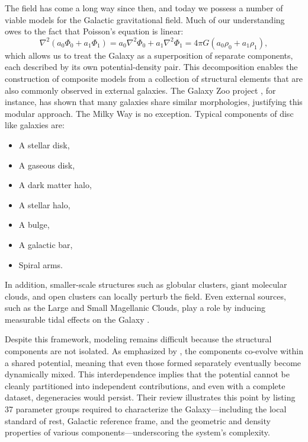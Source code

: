         The field has come a long way since then, and today we possess a number of viable models for the Galactic gravitational field. Much of our understanding owes to the fact that Poisson's equation is linear:
        \begin{equation}\label{eq:linear_poisson}
            \nabla^2 \left(a_0\Phi_0 + a_1\Phi_1 \right) = a_0 \nabla^2 \Phi_0 + a_1 \nabla^2 \Phi_1 = 4\pi G \left(a_0\rho_0 +a_1\rho_1\right),
        \end{equation}
        which allows us to treat the Galaxy as a superposition of separate components, each described by its own potential-density pair. This decomposition enables the construction of composite models from a collection of structural elements that are also commonly observed in external galaxies. The Galaxy Zoo project \citep{2008MNRAS.389.1179L}, for instance, has shown that many galaxies share similar morphologies, justifying this modular approach. The Milky Way is no exception. Typical components of disc like galaxies are:
        \begin{itemize}
            \item A stellar disk,
            \item A gaseous disk,
            \item A dark matter halo,
            \item A stellar halo,
            \item A bulge,
            \item A galactic bar,
            \item Spiral arms.
        \end{itemize}
        In addition, smaller-scale structures such as globular clusters, giant molecular clouds, and open clusters can locally perturb the field. Even external sources, such as the Large and Small Magellanic Clouds, play a role by inducing measurable tidal effects on the Galaxy \citep[see, for example][]{2021MNRAS.501.2279V,2022ApJ...939....2A}.

        Despite this framework, modeling remains difficult because the structural components are not isolated. As emphasized by \citet{2016ARA&A..54..529B}, the components co-evolve within a shared potential, meaning that even those formed separately eventually become dynamically mixed. This interdependence implies that the potential cannot be cleanly partitioned into independent contributions, and even with a complete dataset, degeneracies would persist. Their review illustrates this point by listing 37 parameter groups required to characterize the Galaxy—including the local standard of rest, Galactic reference frame, and the geometric and density properties of various components—underscoring the system's complexity.

